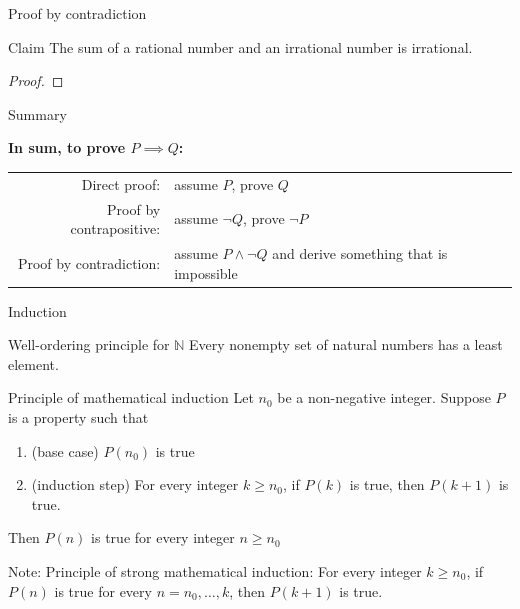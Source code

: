 \documentclass [aspectratio=169]{beamer}
\begin{document}
\begin{frame}{Proof by contradiction}
\begin{exampleblock}{Claim}
The sum of a rational number and an irrational number is irrational.
\end{exampleblock}

\begin{proof}
\vspace{5em}
\end{proof}
\end{frame}



\begin{frame}{Summary}

{\bf In sum, to prove $P \implies Q$:} \\

\vspace{1em}


\begin{tabular}{r l}
     Direct proof:  & assume $P$, prove $Q$ \\
     Proof by contrapositive:  & assume $\neg Q$, prove $\neg P$ \\ 
     Proof by contradiction: & assume $P \wedge \neg Q$ and derive something that is impossible \\ 
\end{tabular}

\end{frame}


\begin{frame}{Induction}

\begin{block}{Well-ordering principle for $\mathbb{N}$}
Every nonempty set of natural numbers has a least element.
\end{block}

\begin{block}{Principle of mathematical induction}
Let $n_0$ be a non-negative integer. Suppose $P$ is a property such that 
\begin{enumerate}
\item(base case) $P(n_0)$ is true 
\item (induction step) For every integer $k \geq n_0$, if $P(k)$ is true, then $P(k+1)$ is true.
\end{enumerate}
Then $P(n)$ is true for every integer $n \geq n_0$
\end{block}

Note: Principle of strong mathematical induction: For every integer $k \geq n_0$, if $P(n)$ is true for every $n = n_0, \ldots, k$, then $P(k+1)$ is true.
\end{frame}
\end{document}
